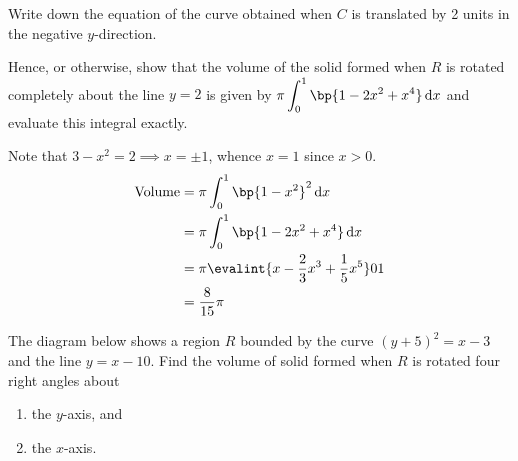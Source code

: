 \documentclass{echw}
\begin{document}
        Write down the equation of the curve obtained when $C$ is translated by 2 units in the negative $y$-direction.

        Hence, or otherwise, show that the volume of the solid formed when $R$ is rotated completely about the line $y = 2$ is given by $\pi \displaystyle\int_0^1 \bp{1 - 2x^2 + x^4} \d x$ and evaluate this integral exactly.

    \solution

        Note that $3 - x^2 = 2 \implies x = \pm 1$, whence $x = 1$ since $x > 0$.
        \begin{align*}
            \volume &= \pi\int_0^1 \bp{1 - x^2}^2 \d x\\
            &= \pi\int_0^1 \bp{1 - 2x^2 + x^4} \d x\\
            &= \pi \evalint{x - \dfrac23 x^3 + \dfrac15 x^5}01\\
            &= \dfrac{8}{15} \pi
        \end{align*}


    \problem{}
        The diagram below shows a region $R$ bounded by the curve $(y + 5)^2 = x-3$ and the line $y = x - 10$. Find the volume of solid formed when $R$ is rotated four right angles about 
        \begin{enumerate}
            \item the $y$-axis, and
            \item the $x$-axis.
        \end{enumerate}
\end{document}
